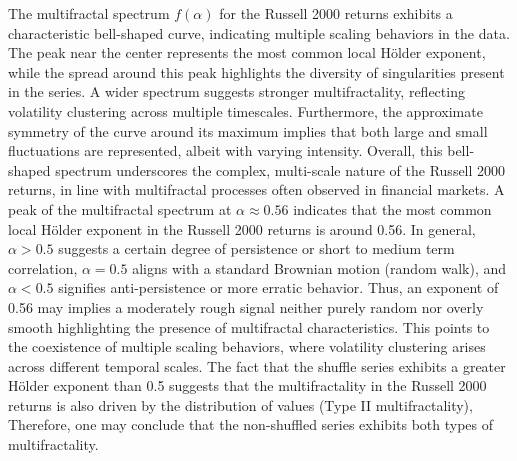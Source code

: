 \documentclass[11pt]{extarticle}
\begin{document}
\FloatBarrier

The multifractal spectrum $f(\alpha)$ for the Russell 2000 returns exhibits a characteristic bell-shaped curve,
indicating multiple scaling behaviors in the data. The peak near the center represents the most common local Hölder
exponent, while the spread around this peak highlights the diversity of singularities present in the series. A wider
spectrum suggests stronger multifractality, reflecting volatility clustering across multiple timescales. Furthermore,
the approximate symmetry of the curve around its maximum implies that both large and small fluctuations are represented,
albeit with varying intensity. Overall, this bell-shaped spectrum underscores the complex, multi-scale nature of the
Russell 2000 returns, in line with multifractal processes often observed in financial markets.
A peak of the multifractal spectrum at $\alpha \approx 0.56$ indicates that the most common local Hölder exponent
in the Russell 2000 returns is around 0.56. In general, $\alpha > 0.5$ suggests a certain degree of persistence or
short to medium term correlation, $\alpha = 0.5$ aligns with a standard Brownian motion (random walk),
and $\alpha < 0.5$ signifies anti-persistence or more erratic behavior. Thus, an exponent of 0.56 may implies a
moderately rough signal neither purely random nor overly smooth highlighting the presence of multifractal characteristics.
This points to the coexistence of multiple scaling behaviors, where volatility clustering arises across different temporal scales.
The fact that the shuffle series exhibits a greater Hölder exponent than 0.5 suggests that the
multifractality in the Russell 2000 returns is also driven by the distribution of values (Type II multifractality),
Therefore, one may conclude that the non-shuffled series exhibits both types of multifractality.
\end{document}
